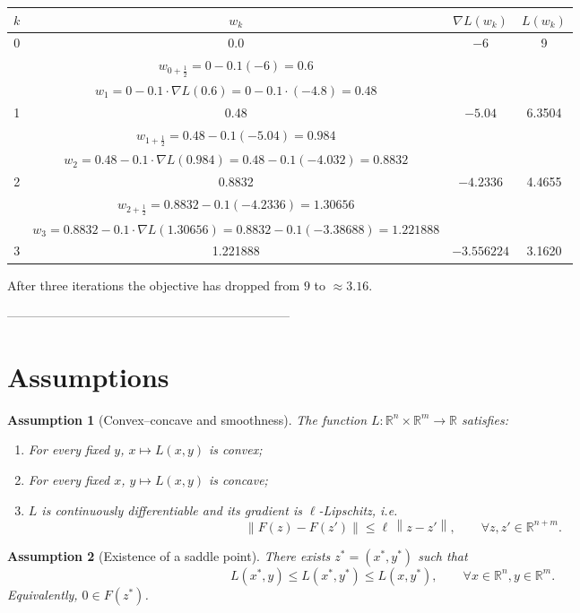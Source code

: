 \documentclass{article}
\newtheorem{assumption}{Assumption}
\newcommand{\R}{\mathbb{R}}
\newcommand{\norm}[1]{\left\lVert #1\right\rVert}
\newcommand{\grad}{\nabla}
\begin{document}
\begin{center}
\begin{tabular}{c|c|c|c}
\(k\) & \(w_{k}\) & \(\grad L(w_{k})\) & \(L(w_{k})\)\\\hline
0 & 0.0 & \(-6\) & 9\\
 & \(w_{0+\frac12}=0-0.1(-6)=0.6\) & &\\
 & \(w_{1}=0-0.1\cdot\grad L(0.6)=0-0.1\cdot(-4.8)=0.48\) & &\\\hline
1 & 0.48 & \(-5.04\) & 6.3504\\
 & \(w_{1+\frac12}=0.48-0.1(-5.04)=0.984\) & &\\
 & \(w_{2}=0.48-0.1\cdot\grad L(0.984)=0.48-0.1(-4.032)=0.8832\) & &\\\hline
2 & 0.8832 & \(-4.2336\) & 4.4655\\
 & \(w_{2+\frac12}=0.8832-0.1(-4.2336)=1.30656\) & &\\
 & \(w_{3}=0.8832-0.1\cdot\grad L(1.30656)=0.8832-0.1(-3.38688)=1.221888\) & &\\\hline
3 & 1.221888 & \(-3.556224\) & 3.1620
\end{tabular}
\end{center}
After three iterations the objective has dropped from \(9\) to \(\approx3.16\).

--------------------------------------------------------------------
\section*{Assumptions}
\begin{assumption}[Convex–concave and smoothness]\label{as:convconc}
The function \(L:\R^{n}\times\R^{m}\to\R\) satisfies:
\begin{enumerate}[label=(\roman*)]
\item For every fixed \(y\), \(x\mapsto L(x,y)\) is convex;
\item For every fixed \(x\), \(y\mapsto L(x,y)\) is concave;
\item \(L\) is continuously differentiable and its gradient is
\(\ell\)-Lipschitz, i.e.
\[
\norm{F(z)-F(z')}\le \ell\,\norm{z-z'},\qquad\forall z,z'\in\R^{n+m}.
\]
\end{enumerate}
\end{assumption}

\begin{assumption}[Existence of a saddle point]\label{as:saddle}
There exists \(z^{*}=(x^{*},y^{*})\) such that
\[
L(x^{*},y)\le L(x^{*},y^{*})\le L(x,y^{*}),\qquad\forall x\in\R^{n},y\in\R^{m}.
\]
Equivalently, \(0\in F(z^{*})\).
\end{assumption}
\end{document}
